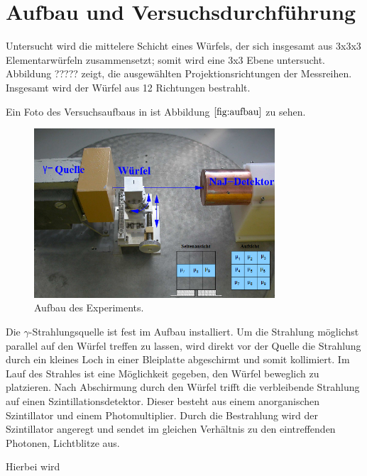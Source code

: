 \section{Aufbau und Versuchsdurchführung}

Untersucht wird die mittelere Schicht eines Würfels, der sich insgesamt aus 3x3x3 Elementarwürfeln zusammensetzt; somit wird eine 3x3 Ebene untersucht.
Abbildung ????? zeigt, die ausgewählten Projektionsrichtungen der Messreihen.
Insgesamt wird der Würfel aus 12 Richtungen bestrahlt.





Ein Foto des Versuchsaufbaus in ist Abbildung $\ref{fig:aufbau}$ zu sehen.
\begin{figure}[H]
  \centering
  \includegraphics[width=0.8\textwidth]{Bilder/aufbau.png}
  \caption{Aufbau des Experiments.\cite{anleitung}}
  \label{fig:aufbau}
\end{figure}

Die $\gamma$-Strahlungsquelle ist fest im Aufbau installiert. Um die Strahlung möglichst parallel auf den Würfel treffen zu lassen, wird direkt vor der Quelle die Strahlung durch ein
kleines Loch in einer Bleiplatte abgeschirmt und somit kollimiert.
Im Lauf des Strahles ist eine Möglichkeit gegeben, den Würfel beweglich zu platzieren.
Nach Abschirmung durch den Würfel trifft die verbleibende Strahlung auf einen Szintillationsdetektor.
Dieser besteht aus einem anorganischen Szintillator und einem Photomultiplier.
Durch die Bestrahlung wird der Szintillator angeregt und sendet im gleichen Verhältnis zu den eintreffenden Photonen, Lichtblitze aus.


Hierbei wird
